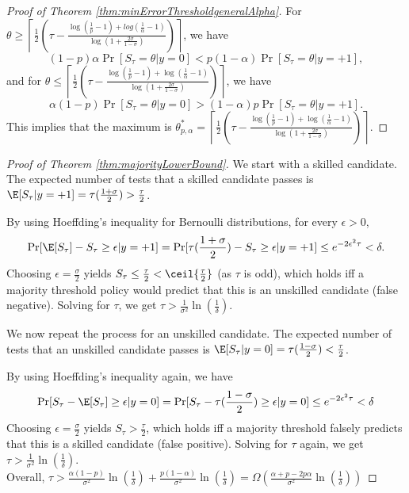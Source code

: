 \begin{proof}[Proof of Theorem \ref{thm:minErrorThresholdgeneralAlpha}]
For $\theta\geq \left \lceil \frac{1}{2}(\tau-\frac{\log(\frac{1}{p}-1)+log(\frac{1}{\alpha}-1)}{\log(1+\frac{2\sigma}{1-\sigma})})\right\rceil$,
we have $$(1-p)\alpha\Pr[S_{\tau}=\theta|y=0]<
p(1-\alpha)\Pr[S_{\tau}=\theta|y=+1],$$ 
and for $\theta\leq \left \lceil \frac{1}{2}(\tau-\frac{\log(\frac{1}{p}-1)+\log(\frac{1}{\alpha}-1)}{\log(1+\frac{2\sigma}{1-\sigma})})\right \rceil$, we have $$\alpha(1-p)\Pr[S_{\tau}=\theta|y=0]>
(1-\alpha)p\Pr[S_{\tau}=\theta|y=+1].$$ This implies that the maximum is
$\theta^*_{p,\alpha}=\left \lceil \frac{1}{2}(\tau-\frac{\log(\frac{1}{p}-1)+\log(\frac{1}{\alpha}-1)}{\log(1+\frac{2\sigma}{1-\sigma})})\right \rceil$.


\end{proof}



\begin{proof}[Proof of Theorem \ref{thm:majorityLowerBound}]
We start with a skilled candidate. 
The expected number of tests 
that a skilled candidate passes is $\E[S_{\tau}|y=+1]=\tau(\frac{1+\sigma}{2})>\frac{\tau}{2}$.

By using Hoeffding's inequality for Bernoulli distributions, for every $\epsilon>0$,
\[
\Pr[\E[S_{\tau}]-S_{\tau}\geq \epsilon|y=+1]=\Pr[\tau(\frac{1+\sigma}{2})-S_{\tau}\geq \epsilon|y=+1]\leq e^{-2\epsilon^2 \tau}<\delta.
\]
Choosing $\epsilon=\frac{\sigma}{2}$ yields $S_\tau\leq \frac{\tau}{2}<\ceil{\frac{\tau}{2}}$ (as $\tau$ is odd), which holds iff a majority threshold policy would predict that this is an unskilled candidate (false negative). Solving for $\tau$, we get $\tau>\frac{1}{\sigma^2}\ln(\frac{1}{\delta})$.

We now repeat the process for an unskilled candidate. The expected number of tests that an unskilled candidate passes is $\E[S_{\tau}|y=0]=\tau(\frac{1-\sigma}{2})<\frac{\tau}{2}$.

By using Hoeffding's inequality again, we have
\[
\Pr[S_{\tau}-\E[S_{\tau}]\geq \epsilon|y=0]=\Pr[S_{\tau}-\tau(\frac{1-\sigma}{2})\geq \epsilon|y=0]\leq e^{-2\epsilon^2 \tau} <\delta
\]
Choosing $\epsilon=\frac{\sigma}{2}$ yields $S_\tau>\frac{\tau}{2}$, 
which holds iff a majority threshold falsely predicts 
that this is a skilled candidate (false positive). 
Solving for $\tau$ again, we get
$\tau>\frac{1}{\sigma^2}\ln(\frac{1}{\delta})$.\\
Overall, $\tau>\frac{\alpha(1-p)}{\sigma^2}\ln(\frac{1}{\delta})+\frac{p(1-\alpha)}{\sigma^2}\ln(\frac{1}{\delta})=\Omega(\frac{\alpha+p-2p\alpha}{\sigma^2}\ln(\frac{1}{\delta}))$
\end{proof} 

